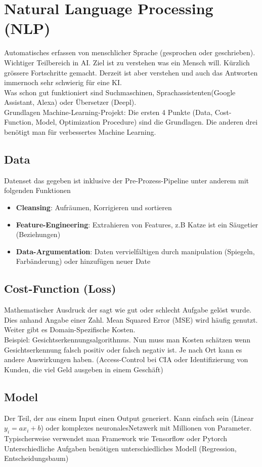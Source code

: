 \section{Natural Language Processing (NLP)}
Automatisches erfassen von menschlicher Sprache (gesprochen oder geschrieben). Wichtiger Teilbereich in AI. Ziel ist zu verstehen was ein Mensch will. Kürzlich grössere Fortschritte gemacht. Derzeit ist aber verstehen und auch das Antworten immernoch sehr schwierig für eine KI.\\
Was schon gut funktioniert sind Suchmaschinen, Sprachassistenten(Google Assistant, Alexa) oder Übersetzer (Deepl).
\\
\textcolor{myblue}{Grundlagen Machine-Learning-Projekt:} Die ersten 4 Punkte (Data, Cost-Function, Model, Optimization Procedure) sind die Grundlagen. Die anderen drei benötigt man für verbessertes Machine Learning.
\subsection{Data}
Datenset das gegeben ist inklusive der Pre-Prozess-Pipeline unter anderem mit folgenden Funktionen
\begin{itemize}
\item \textbf{Cleansing}: Aufräumen, Korrigieren und sortieren
\item \textbf{Feature-Engineering}: Extrahieren von Features, z.B Katze ist ein Säugetier (Beziehungen)
\item \textbf{Data-Argumentation}: Daten vervielfältigen durch manipulation (Spiegeln, Farbänderung) oder hinzufügen neuer Date
\end{itemize}

\subsection{Cost-Function (Loss)}
Mathematischer Ausdruck der sagt wie gut oder schlecht Aufgabe gelöst wurde. Dies anhand Angabe einer Zahl. Mean Squared Error (MSE) wird häufig genutzt. Weiter gibt es Domain-Spezifische Kosten.
\\
Beispiel: Gesichtserkennungsalgorithmus. Nun muss man Kosten schätzen wenn Gesichtserkennung falsch positiv oder falsch
negativ ist. Je nach Ort kann es andere Auswirkungen haben. (Access-Control bei CIA oder Identifizierung von Kunden, die viel
Geld ausgeben in einem Geschäft)
\subsection{Model}
Der Teil, der aus einem Input einen Output generiert. Kann einfach sein (Linear $y_i = ax_i + b$) oder komplexes neuronalesNetzwerk mit Millionen von Parameter.
\\
Typischerweise verwendet man Framework wie Tensorflow oder Pytorch
\\
Unterschiedliche Aufgaben benötigen unterschiedliches Modell (Regression, Entscheidungsbaum)
